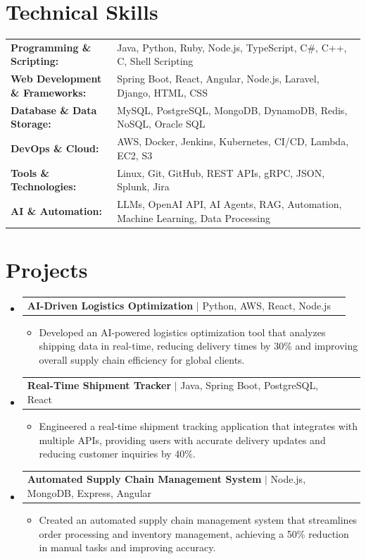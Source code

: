\documentclass[letterpaper,10pt]{article}
\makeatletter
\newcommand{\resumeItem}[1]{
  \item{\fontsize{8pt}{9pt}\selectfont
    #1 \vspace{-3pt}
  }
}
\newcommand{\resumeProjectHeading}[2]{
    \item
    \begin{tabular*}{1.001\textwidth}{l@{\extracolsep{\fill}}r}
      \fontsize{8.5pt}{10pt}#1 & \textbf{\fontsize{8.5pt}{10pt} #2}\\
    \end{tabular*}\vspace{-7pt}
}
\newcommand{\resumeSubHeadingListStart}{\begin{itemize}[leftmargin=0pt, label={}]}
\newcommand{\resumeSubHeadingListEnd}{\end{itemize}}
\newcommand{\resumeItemListStart}{\begin{itemize}[leftmargin=*]}
\newcommand{\resumeItemListEnd}{\end{itemize}\vspace{-5pt}}
\makeatother
\begin{document}
\section{Technical Skills}
        \vspace{-14pt}
        \begin{table}[h]
            \fontsize{8pt}{9pt}\selectfont
            \begin{tabular}{p{0.3\linewidth} p{0.7\linewidth}}
                \textbf{Programming \& Scripting:} & Java, Python, Ruby, Node.js, TypeScript, C\#, C++, C, Shell Scripting \\
                \textbf{Web Development \& Frameworks:} & Spring Boot, React, Angular, Node.js, Laravel, Django, HTML, CSS \\
                \textbf{Database \& Data Storage:} & MySQL, PostgreSQL, MongoDB, DynamoDB, Redis, NoSQL, Oracle SQL \\
                \textbf{DevOps \& Cloud:} & AWS, Docker, Jenkins, Kubernetes, CI/CD, Lambda, EC2, S3 \\
                \textbf{Tools \& Technologies:} & Linux, Git, GitHub, REST APIs, gRPC, JSON, Splunk, Jira \\
                \textbf{AI \& Automation:} & LLMs, OpenAI API, AI Agents, RAG, Automation, Machine Learning, Data Processing \\
            \end{tabular}
        \end{table}
 \vspace{-18pt}

\section{Projects}
    \vspace{-5pt}
    \resumeSubHeadingListStart
          \resumeProjectHeading
            {\textbf{AI-Driven Logistics Optimization} $|$ Python, AWS, React, Node.js}{}
            \resumeItemListStart
                \resumeItem{Developed an AI-powered logistics optimization tool that analyzes shipping data in real-time, reducing delivery times by 30\% and improving overall supply chain efficiency for global clients.}
            \resumeItemListEnd
        \vspace{-12pt}
    
        \resumeProjectHeading
            {\textbf{Real-Time Shipment Tracker} $|$ Java, Spring Boot, PostgreSQL, React}{}
        \resumeItemListStart
                \resumeItem{Engineered a real-time shipment tracking application that integrates with multiple APIs, providing users with accurate delivery updates and reducing customer inquiries by 40\%.}
        \resumeItemListEnd
      \vspace{-12pt}
      \resumeProjectHeading
        {\textbf{Automated Supply Chain Management System} $|$ Node.js, MongoDB, Express, Angular}{}
    \resumeItemListStart
            \resumeItem{Created an automated supply chain management system that streamlines order processing and inventory management, achieving a 50\% reduction in manual tasks and improving accuracy.}
    \resumeItemListEnd
    \resumeSubHeadingListEnd
\end{document}

